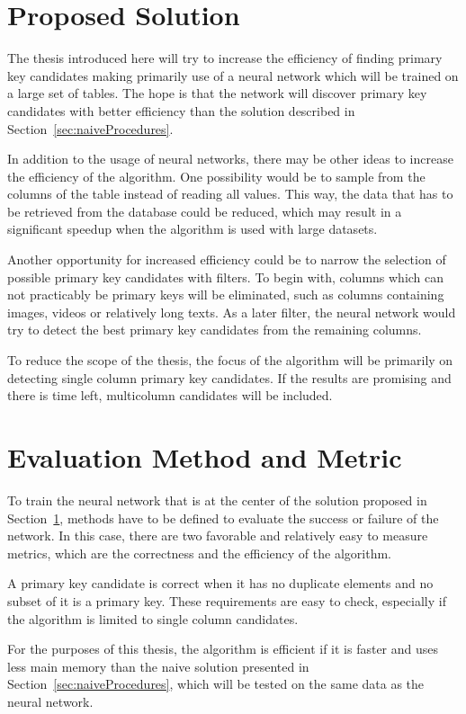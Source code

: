 \documentclass[a4paper]{article}
\begin{document}
\section{Proposed Solution}\label{sec:proposedSolution}
The thesis introduced here will try to increase the efficiency of finding primary key candidates making primarily use of a neural network  which will be trained on a large set of tables. The hope is that the network will discover primary key candidates with better efficiency than the solution described in Section~\ref{sec:naiveProcedures}.

In addition to the usage of neural networks, there may be other ideas to increase the efficiency of the algorithm. One possibility would be to sample from the columns of the table instead of reading all values. This way, the data that has to be retrieved from the database could be reduced, which may result in a significant speedup when the algorithm is used with large datasets.

Another opportunity for increased efficiency could be to narrow the selection of possible primary key candidates with filters. To begin with, columns which can not practicably be primary keys will be eliminated, such as columns containing images, videos or relatively long texts. As a later filter, the neural network would try to detect the best primary key candidates from the remaining columns.

To reduce the scope of the thesis, the focus of the algorithm will be primarily on detecting single column primary key candidates. If the results are promising and there is time left, multicolumn candidates will be included.


\section{Evaluation Method and Metric}
To train the neural network that is at the center of the solution proposed in Section~\ref{sec:proposedSolution}, methods have to be defined to evaluate the success or failure of the network. In this case, there are two favorable and relatively easy to measure metrics, which are the correctness and the efficiency of the algorithm.

A primary key candidate is correct when it has no duplicate elements and no subset of it is a primary key. These requirements are easy to check, especially if the algorithm is limited to single column candidates.

For the purposes of this thesis, the algorithm is efficient if it is faster and uses less main memory than the naive solution presented in Section~\ref{sec:naiveProcedures}, which will be tested on the same data as the neural network.
\end{document}
